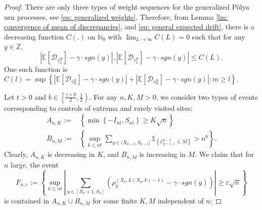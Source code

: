\documentclass[twoside,12pt, a4paper]{article}
\numberwithin{equation}{section}
\theoremstyle{remark}
\newcommand{\abs}[1]{\left\vert #1 \right\vert}
\begin{document}
\begin{proof} There are only three types of weight sequences for the generalized P\'{o}lya urn processes, see \eqref{eq: generalized weights}. Therefore, from Lemma \ref{lm: convergence of mean of discrepancies}, and 
	\eqref{eq: general expected drift}, there is a decreasing function $C(.)$ on $\mathbb{N}_0$ with $\lim_{L\to \infty}C(L) =0$ such that for any $y \in \mathbb{Z}$,
	\begin{equation}\label{eq: uniform convergence}
		\abs{\mathbb{E}\left[ \mathcal{D}_{\tau_L^{\mathcal{R}}} \right] - \gamma \cdot sgn(y)}, \abs{\mathbb{E}\left[ \mathcal{D}_{\tau_L^{\mathcal{B}}} \right] - \gamma \cdot sgn(y)} \leq C(L).
	\end{equation} One such function is $C(l) = \sup \left\{  \abs{\mathbb{E}\left[ \mathcal{D}_{\tau_m^{\mathcal{R}}} \right] - \gamma \cdot sgn(y)} + \abs{\mathbb{E}\left[ \mathcal{D}_{\tau_m^{\mathcal{B}}} \right] - \gamma \cdot sgn(y)} : m\geq l \right\}.     $  
	
	
	Let $t>0$ and $b \in \left[\frac{\gamma \vee 0 }{2},\frac{1}{2}\right)$. For any $n,K,M>0$, we consider two types of events corresponding to controls of extrema and rarely visited sites:
	\begin{align*}
		A_{n,K}:=&\left\{ \min\left\{-I_{nt}, S_{nt}\right\} \geq K \sqrt{n}  \right\}
		\\
		B_{n,M}:=& \left\{  \sup_{k\leq n t} \sum_{ y\in (X_{k-1}, S_{k-1}]}  \mathbb{1}_{\left\{ \mathcal{E}^{k-1}_{y-1,+} \leq M  \right\}} >n^b  \right\}.
	\end{align*}
	Clearly, $A_{n,K}$ is decreasing in $K$, and $B_{n,M}$ is increasing in $M$. We claim that for $n$ large, the event 
	$$
	F_{n,\varepsilon}:= \left\{ \sup_{k\leq n t}  \abs{  	\sum_{y\in [X_{k}+1 ,S_k]} \left( \rho^{(X_k,L(X_k,k)-1)}_y -  \gamma \cdot sgn(y) \right) } \geq  \varepsilon \sqrt{n}    \right\}
	$$ 
	is contained in $A_{n,K} \cup B_{n,M} $ for some finite $K, M$ independent of $n$:   
	

\end{proof}
\end{document}
